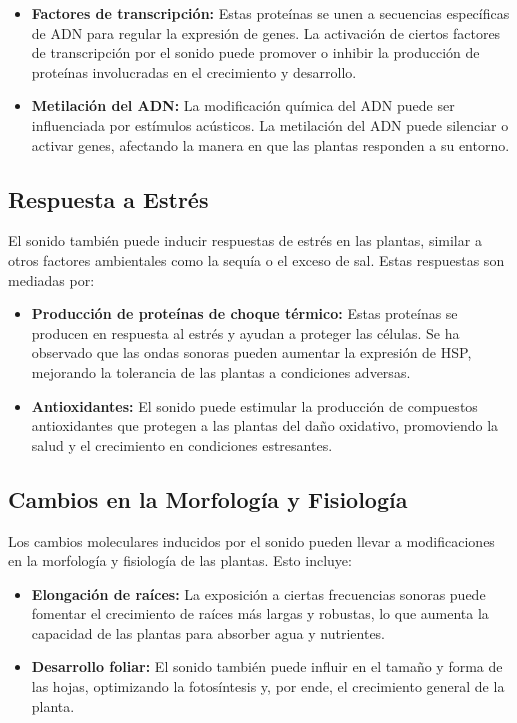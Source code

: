 \documentclass[twocolumn]{article}
\begin{document}
\begin{itemize}
    \item \textbf{Factores de transcripción:} Estas proteínas se unen a secuencias específicas de ADN para regular la expresión
     de genes. La activación de ciertos factores de transcripción por el sonido puede promover o inhibir la producción de proteínas
      involucradas en el crecimiento y desarrollo.
    
    \item \textbf{Metilación del ADN:} La modificación química del ADN puede ser influenciada por estímulos acústicos. 
    La metilación del ADN puede silenciar o activar genes, afectando la manera en que las plantas responden a su entorno.
\end{itemize}

\subsection{Respuesta a Estrés}

El sonido también puede inducir respuestas de estrés en las plantas, similar a otros factores ambientales como la sequía o el exceso de sal. Estas respuestas son mediadas por:

\begin{itemize}
    \item \textbf{Producción de proteínas de choque térmico:} Estas proteínas se producen en respuesta al estrés y ayudan a proteger las células. Se ha observado que las ondas sonoras pueden aumentar la expresión de HSP, mejorando la tolerancia de las plantas a condiciones adversas.
    
    \item \textbf{Antioxidantes:} El sonido puede estimular la producción de compuestos antioxidantes que protegen a las plantas del daño oxidativo, promoviendo la salud y el crecimiento en condiciones estresantes.
\end{itemize}

\subsection{Cambios en la Morfología y Fisiología}

Los cambios moleculares inducidos por el sonido pueden llevar a modificaciones en la morfología y fisiología de las plantas. Esto incluye:

\begin{itemize}
    \item \textbf{Elongación de raíces:} La exposición a ciertas frecuencias sonoras puede fomentar el crecimiento de raíces más largas y robustas, lo que aumenta la capacidad de las plantas para absorber agua y nutrientes.
    
    \item \textbf{Desarrollo foliar:} El sonido también puede influir en el tamaño y forma de las hojas, optimizando la fotosíntesis y, por ende, el crecimiento general de la planta.
\end{itemize}
\end{document}
